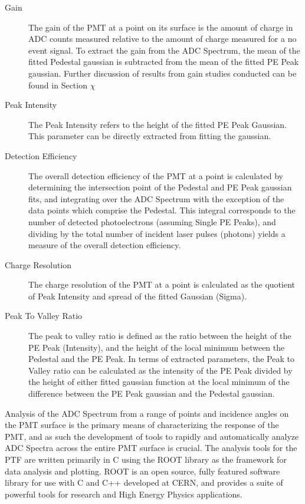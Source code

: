 \documentclass[journal]{IEEEtran}
\begin{document}
\begin{description}

\item[Gain]
The gain of the PMT at a point on its surface is the amount of charge in ADC counts measured relative to the amount of charge measured for a no event signal.  To extract the gain from the ADC Spectrum, the mean of the fitted Pedestal gaussian is subtracted from the mean of the fitted PE Peak gaussian. Further discussion of results from gain studies conducted can be found in Section $\chi$
\vskip 0.05in
\item[Peak Intensity]
The Peak Intensity refers to the height of the fitted PE Peak Gaussian.  This parameter can be directly extracted from fitting the gaussian.
\vskip 0.05in
\item[Detection Efficiency]
The overall detection efficiency of the PMT at a point is calculated by determining the intersection point of the Pedestal and PE Peak gaussian fits, and integrating over the ADC Spectrum with the exception of the data points which comprise the Pedestal.  This integral corresponds to the number of detected photoelectrons (assuming Single PE Peaks), and dividing by the total number of incident laser pulses (photons) yields a measure of the overall detection efficiency.
\vskip 0.05in

\item[Charge Resolution]
The charge resolution of the PMT at a point is calculated as the quotient of Peak Intensity and spread of the fitted Gaussian (Sigma).
\vskip 0.05in

\item[Peak To Valley Ratio]
The peak to valley ratio is defined as the ratio between the height of the PE Peak (Intensity), and the height of the local minimum between the Pedestal and the PE Peak.  In terms of extracted parameters, the Peak to Valley ratio can be calculated as the intensity of the PE Peak divided by the height of either fitted gaussian function at the local minimum of the difference between the PE Peak gaussian and the Pedestal gaussian.

\end{description}
\vskip 0.05in

Analysis of the ADC Spectrum from a range of points and incidence angles on the PMT surface is the primary means of characterizing the response of the PMT, and as such the development of tools to rapidly and automatically analyze ADC Spectra across the entire PMT surface is crucial. The analysis tools for the PTF are written primarily in C using the ROOT library as the framework for data analysis and plotting.  ROOT is an open source, fully featured software library for use with C and C++ developed at CERN, and provides a suite of powerful tools for research and High Energy Physics applications. 
\end{document}
